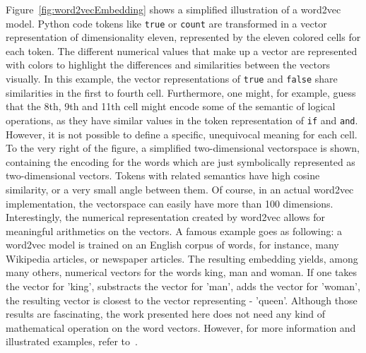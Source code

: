 \documentclass[
a4paper,
pagesize,
pdftex,
12pt,
twoside, %
BCOR=5mm, %
ngerman,
fleqn,
final,
]{scrartcl}
\begin{document}
	Figure~\ref{fig:word2vecEmbedding} shows a simplified illustration of a word2vec model. Python code tokens like \texttt{true} or \texttt{count} are transformed in a vector representation of dimensionality eleven, represented by the eleven colored cells for each token. The different numerical values that make up a vector are represented with colors to highlight the differences and similarities between the vectors visually. In this example, the vector representations of \texttt{true} and \texttt{false} share similarities in the first to fourth cell. Furthermore, one might, for example, guess that the 8th, 9th and 11th cell might encode some of the semantic of logical operations, as they have similar values in the token representation of \texttt{if} and \texttt{and}. However, it is not possible to define a specific, unequivocal meaning for each cell.\\
	To the very right of the figure, a simplified two-dimensional vectorspace is shown, containing the encoding for the words which are just symbolically represented as two-dimensional vectors. Tokens with related semantics have high cosine similarity, or a very small angle between them. Of course, in an actual word2vec implementation, the vectorspace can easily have more than 100 dimensions.\\
	Interestingly, the numerical representation created by word2vec allows for meaningful arithmetics on the vectors. A famous example goes as following: a word2vec model is trained on an English corpus of words, for instance, many Wikipedia articles, or newspaper articles. The resulting embedding yields, among many others, numerical vectors for the words king, man and woman. If one takes the vector for 'king', substracts the vector for 'man', adds the vector for 'woman', the resulting vector is closest to the vector representing - 'queen'. Although those results are fascinating, the work presented here does not need any kind of mathematical operation on the word vectors. However, for more information and illustrated examples, refer to~\cite{Word2Vec}.
	
\end{document}
